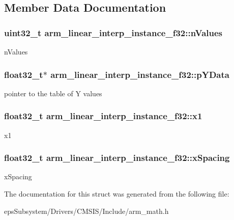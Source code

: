 \subsection{Member Data Documentation}
\hypertarget{structarm__linear__interp__instance__f32_a95f02a926b16d35359aca5b31e813b11}{
\subsubsection[{n\-Values}]{\setlength{\rightskip}{0pt plus 5cm}uint32\-\_\-t arm\-\_\-linear\-\_\-interp\-\_\-instance\-\_\-f32\-::n\-Values}}\label{structarm__linear__interp__instance__f32_a95f02a926b16d35359aca5b31e813b11}
n\-Values \hypertarget{structarm__linear__interp__instance__f32_ab373001f6afad0850359c344a4d7eee4}{
\subsubsection[{p\-Y\-Data}]{\setlength{\rightskip}{0pt plus 5cm}float32\-\_\-t$\ast$ arm\-\_\-linear\-\_\-interp\-\_\-instance\-\_\-f32\-::p\-Y\-Data}}\label{structarm__linear__interp__instance__f32_ab373001f6afad0850359c344a4d7eee4}
pointer to the table of Y values \hypertarget{structarm__linear__interp__instance__f32_a08352dc6ea82fbc0827408e018535481}{
\subsubsection[{x1}]{\setlength{\rightskip}{0pt plus 5cm}float32\-\_\-t arm\-\_\-linear\-\_\-interp\-\_\-instance\-\_\-f32\-::x1}}\label{structarm__linear__interp__instance__f32_a08352dc6ea82fbc0827408e018535481}
x1 \hypertarget{structarm__linear__interp__instance__f32_aa8e2d686b5434a406d390b347b183511}{
\subsubsection[{x\-Spacing}]{\setlength{\rightskip}{0pt plus 5cm}float32\-\_\-t arm\-\_\-linear\-\_\-interp\-\_\-instance\-\_\-f32\-::x\-Spacing}}\label{structarm__linear__interp__instance__f32_aa8e2d686b5434a406d390b347b183511}
x\-Spacing 

The documentation for this struct was generated from the following file\-:\begin{DoxyCompactItemize}
\item 
eps\-Subsystem/\-Drivers/\-C\-M\-S\-I\-S/\-Include/arm\-\_\-math.\-h\end{DoxyCompactItemize}
